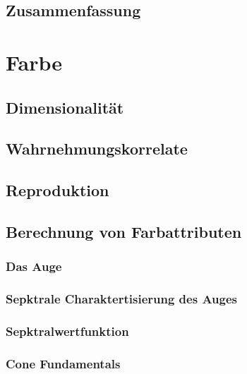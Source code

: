 \documentclass[a4paper, 11pt, accentcolor = tud3b]{tudreport}
\begin{document}
		\section{Zusammenfassung} %

	\chapter{Farbe} %

		\section{Dimensionalität} %

		\section{Wahrnehmungskorrelate} %

		\section{Reproduktion} %

		\section{Berechnung von Farbattributen} %

			\subsection{Das Auge} %

			\subsection{Sepktrale Charaktertisierung des Auges} %

			\subsection{Sepktralwertfunktion} %

			\subsection{Cone Fundamentals} %
\end{document}
